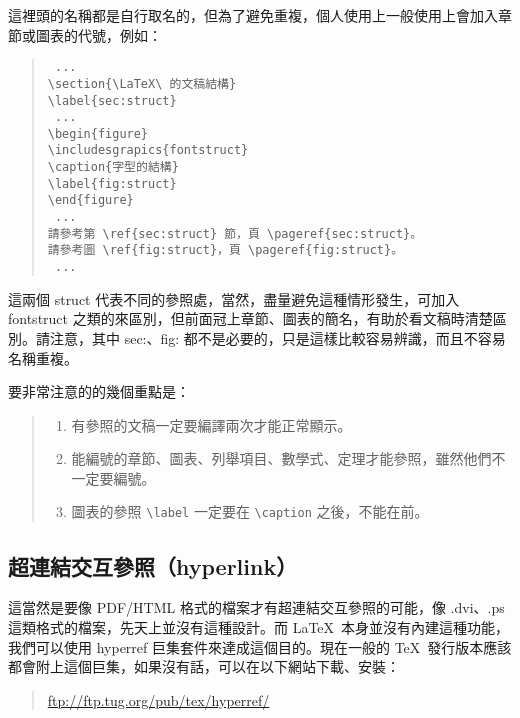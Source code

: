 這裡頭的名稱都是自行取名的，但為了避免重複，個人使用上一般使用上會加入章節或圖表的代號，例如：

\begin{quote}
  \begin{verbatim}
 ...
\section{\LaTeX\ 的文稿結構}
\label{sec:struct}
 ...
\begin{figure}
\includesgrapics{fontstruct}
\caption{字型的結構}
\label{fig:struct}
\end{figure}
 ...
請參考第 \ref{sec:struct} 節，頁 \pageref{sec:struct}。
請參考圖 \ref{fig:struct}，頁 \pageref{fig:struct}。
 ...
\end{verbatim}
\end{quote}

這兩個 {\ttfamily struct} 代表不同的參照處，當然，盡量避免這種情形發生，可加入 {\ttfamily fontstruct} 之類的來區別，但前面冠上章節、圖表的簡名，有助於看文稿時清楚區別。請注意，其中 {\ttfamily sec:}、{\ttfamily fig:} 都不是必要的，只是這樣比較容易辨識，而且不容易名稱重複。

要非常注意的的幾個重點是：
\begin{quote}
  \begin{enumerate}
    \item 有參照的文稿一定要編譯兩次才能正常顯示。
    \item 能編號的章節、圖表、列舉項目、數學式、定理才能參照，雖然他們不一定要編號。
    \item 圖表的參照 \verb|\label| 一定要在 \verb|\caption| 之後，不能在前。
  \end{enumerate}
\end{quote}

\subsection{超連結交互參照（hyperlink）}

這當然是要像 PDF/HTML 格式的檔案才有超連結交互參照的可能，像 {\ttfamily *.dvi}、{\ttfamily *.ps} 這類格式的檔案，先天上並沒有這種設計。而 \LaTeX\ 本身並沒有內建這種功能，我們可以使用 {\sffamily hyperref} 巨集套件來達成這個目的。現在一般的 \TeX\ 發行版本應該都會附上這個巨集，如果沒有話，可以在以下網站下載、安裝：

\begin{quote}
  \url{ftp://ftp.tug.org/pub/tex/hyperref/}
\end{quote}

